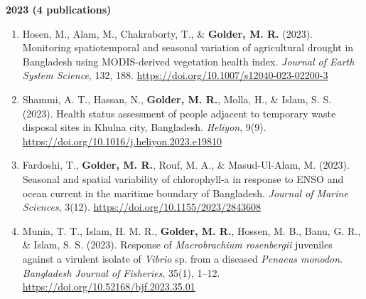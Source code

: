\documentclass[11pt,a4paper,sans]{moderncv}
\begin{document}
\textbf{2023 (4 publications)}
\begin{enumerate}
  \item Hosen, M., Alam, M., Chakraborty, T., \& \textbf{Golder, M. R.} (2023). Monitoring spatiotemporal and seasonal variation of agricultural drought in Bangladesh using MODIS-derived vegetation health index. \textit{Journal of Earth System Science}, 132, 188. \url{https://doi.org/10.1007/s12040-023-02200-3}

  \item Shammi, A. T., Hassan, N., \textbf{Golder, M. R.}, Molla, H., \& Islam, S. S. (2023). Health status assessment of people adjacent to temporary waste disposal sites in Khulna city, Bangladesh. \textit{Heliyon}, 9(9). \url{https://doi.org/10.1016/j.heliyon.2023.e19810}

  \item Fardoshi, T., \textbf{Golder, M. R.}, Rouf, M. A., \& Masud-Ul-Alam, M. (2023). Seasonal and spatial variability of chlorophyll-a in response to ENSO and ocean current in the maritime boundary of Bangladesh. \textit{Journal of Marine Sciences}, 3(12). \url{https://doi.org/10.1155/2023/2843608}

  \item Munia, T. T., Islam, H. M. R., \textbf{Golder, M. R.}, Hossen, M. B., Banu, G. R., \& Islam, S. S. (2023). Response of \textit{Macrobrachium rosenbergii} juveniles against a virulent isolate of \textit{Vibrio} sp. from a diseased \textit{Penaeus monodon}. \textit{Bangladesh Journal of Fisheries}, 35(1), 1–12. \url{https://doi.org/10.52168/bjf.2023.35.01}
\end{enumerate}
\end{document}
